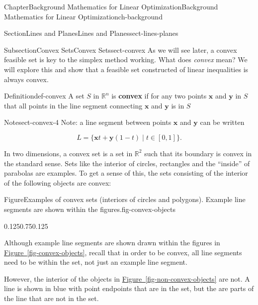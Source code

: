 \documentclass[oneside,10pt,]{book}
\newcommand{\xreffont}{\relax}
\newcommand{\terminology}[1]{\textbf{#1}}
\numberwithin{equation}{section}
\begin{document}
\begin{chapterptx}{Chapter}{Background Mathematics for Linear Optimization}{}{Background Mathematics for Linear Optimization}{}{}{ch-background}
\begin{sectionptx}{Section}{Lines and Planes}{}{Lines and Planes}{}{}{sect-lines-planes}
\begin{subsectionptx}{Subsection}{Convex Sets}{}{Convex Sets}{}{}{sect-convex}
As we will see later, a convex feasible set is key to the simplex method working. What does \emph{convex} mean? We will explore this and show that a feasible set constructed of linear inequalities is always convex.%
\begin{definition}{Definition}{}{def-convex}%
A set \(S\) in \(\mathbb{R}^n\) is \terminology{convex} if for any two points \(\boldsymbol{x}\) and \(\boldsymbol{y}\) in \(S\) that all points in the line segment connecting \(\boldsymbol{x}\) and \(\boldsymbol{y}\) is in \(S\)%
\end{definition}
\begin{note}{Note}{}{sect-convex-4}%
Note: a line segment between points \(\boldsymbol{x}\) and \(\boldsymbol{y}\) can be written%
\par
%
\begin{equation*}
L = \{ \boldsymbol{x} t + \boldsymbol{y} (1-t) \; | \; t \in [0,1]\}.
\end{equation*}
%
\end{note}
In two dimensions, a convex set is a set in \(\mathbb{R}^2\) such that its boundary is convex in the standard sense. Sets like the interior of circles, rectangles and the ``inside'' of parabolas are examples. To get a sense of this, the sets consisting of the interior of the following objects are convex:%
\begin{figureptx}{Figure}{Examples of convex sets (interiors of circles and polygons).  Example line segments are shown within the figures.}{fig-convex-objects}{}%
\begin{image}{0.125}{0.75}{0.125}{}%
%
\end{image}%
\tcblower
\end{figureptx}%
Although example line segments are shown drawn within the figures in \hyperref[fig-convex-objects]{Figure~{\xreffont\ref{fig-convex-objects}}}, recall that in order to be convex, all line segments need to be within the set, not just an example line segment.%
\par
However, the interior of the objects in \hyperref[fig-non-convex-objects]{Figure~{\xreffont\ref{fig-non-convex-objects}}} are not. A line is shown in blue with point endpoints that are in the set, but the are parts of the line that are not in the set.%

\end{subsectionptx}
\end{sectionptx}
\end{chapterptx}
\end{document}
